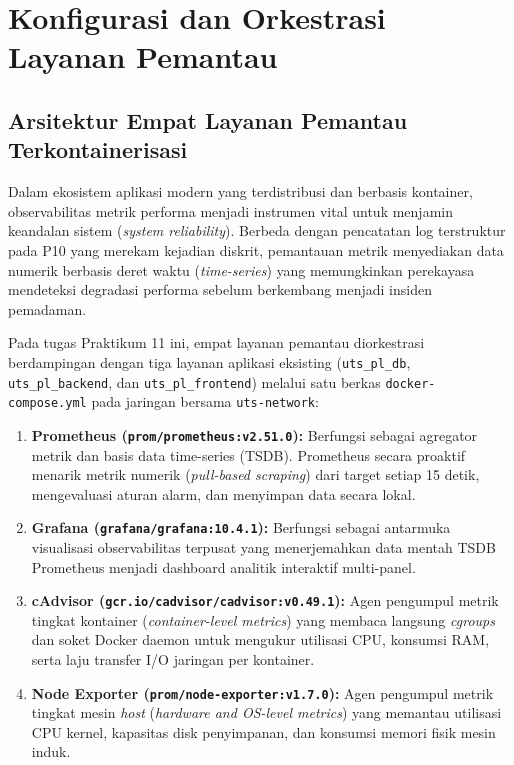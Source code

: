 \documentclass[a4paper,oneside,11pt]{book}
\begin{document}
\tableofcontents
\clearpage
{}
{}
\listoffigures
\clearpage
{}
{}
\listoftables
\clearpage

\mainmatter
{}

\chapter{Konfigurasi dan Orkestrasi Layanan Pemantau}

\section{Arsitektur Empat Layanan Pemantau Terkontainerisasi}
Dalam ekosistem aplikasi modern yang terdistribusi dan berbasis kontainer, observabilitas metrik performa menjadi instrumen vital untuk menjamin keandalan sistem (\textit{system reliability}). Berbeda dengan pencatatan log terstruktur pada P10 yang merekam kejadian diskrit, pemantauan metrik menyediakan data numerik berbasis deret waktu (\textit{time-series}) yang memungkinkan perekayasa mendeteksi degradasi performa sebelum berkembang menjadi insiden pemadaman.

Pada tugas Praktikum 11 ini, empat layanan pemantau diorkestrasi berdampingan dengan tiga layanan aplikasi eksisting (\texttt{uts\_pl\_db}, \texttt{uts\_pl\_backend}, dan \texttt{uts\_pl\_frontend}) melalui satu berkas \texttt{docker-compose.yml} pada jaringan bersama \texttt{uts-network}:
\begin{enumerate}
    \item \textbf{Prometheus (\texttt{prom/prometheus:v2.51.0}):} Berfungsi sebagai agregator metrik dan basis data time-series (TSDB). Prometheus secara proaktif menarik metrik numerik (\textit{pull-based scraping}) dari target setiap 15 detik, mengevaluasi aturan alarm, dan menyimpan data secara lokal.
    \item \textbf{Grafana (\texttt{grafana/grafana:10.4.1}):} Berfungsi sebagai antarmuka visualisasi observabilitas terpusat yang menerjemahkan data mentah TSDB Prometheus menjadi dashboard analitik interaktif multi-panel.
    \item \textbf{cAdvisor (\texttt{gcr.io/cadvisor/cadvisor:v0.49.1}):} Agen pengumpul metrik tingkat kontainer (\textit{container-level metrics}) yang membaca langsung \textit{cgroups} dan soket Docker daemon untuk mengukur utilisasi CPU, konsumsi RAM, serta laju transfer I/O jaringan per kontainer.
    \item \textbf{Node Exporter (\texttt{prom/node-exporter:v1.7.0}):} Agen pengumpul metrik tingkat mesin \textit{host} (\textit{hardware and OS-level metrics}) yang memantau utilisasi CPU kernel, kapasitas disk penyimpanan, dan konsumsi memori fisik mesin induk.
\end{enumerate}
\end{document}
